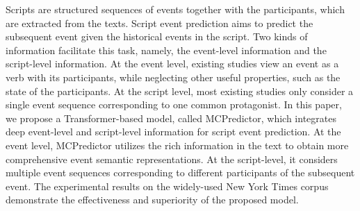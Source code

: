 Scripts are structured sequences of events together with the participants, which are extracted from the texts. Script event prediction aims to predict the subsequent event given the historical events in the script. Two kinds of information facilitate this task, namely, the event-level information and the script-level information. At the event level, existing studies view an event as a verb with its participants, while neglecting other useful properties, such as the state of the participants. At the script level, most existing studies only consider a single event sequence corresponding to one common protagonist. In this paper, we propose a Transformer-based model, called MCPredictor, which integrates deep event-level and script-level information for script event prediction. At the event level, MCPredictor utilizes the rich information in the text to obtain more comprehensive event semantic representations. At the script-level, it considers multiple event sequences corresponding to different participants of the subsequent event. The experimental results on the widely-used New York Times corpus demonstrate the effectiveness and superiority of the proposed model.
